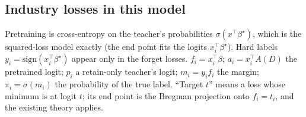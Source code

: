 \documentclass[10pt]{article}
\begin{document}
\begin{landscape}
\section{Industry losses in this model}
\label{sec:industry}
{\footnotesize Pretraining is cross-entropy on the teacher's probabilities $\sigma(x^\top\beta^\star)$, which is the squared-loss model exactly (the end point fits the logits $x_i^\top\beta^\star$). Hard labels $y_i=\mathrm{sign}(x_i^\top\beta^\star)$ appear only in the forget losses. $f_i=x_i^\top\beta$; $a_i=x_i^\top A(D)$ the pretrained logit; $p_i$ a retain-only teacher's logit; $m_i=y_if_i$ the margin; $\pi_i=\sigma(m_i)$ the probability of the true label. ``Target $t$'' means a loss whose minimum is at logit $t$; its end point is the Bregman projection onto $f_i=t_i$, and the existing theory applies.}


\end{landscape}
\end{document}
